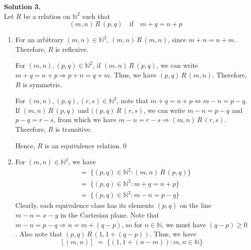 \documentclass[10pt]{article}
\begin{document}
        \textbf{Solution 3.}\\
        Let $R$ be a relation on $\mathbb{N}^2$ such that
        \[(m, n)\,R\,(p, q) \quad\text{if}\quad m + q = n + p\]
        \begin{enumerate}
                \item For an arbitrary $(m, n) \in \mathbb{N}^2$, $(m, n)\,R\,(m, n)$, since $m + n = n + m$. Therefore, $R$
                is reflexive.

                For $(m, n), (p, q) \in \mathbb{N}^2$, if $(m, n)\,R\,(p, q)$, we can write $m + q = n + p \Rightarrow p + n = q + m$.
                Thus, we have $(p, q)\,R\,(m, n)$. Therefore, $R$ is symmetric.

                For $(m, n), (p, q), (r, s) \in \mathbb{N}^2$, note that $m + q = n + p \Leftrightarrow m - n = p - q$.
                If $(m, n)\,R\,(p, q)$ and $((p, q)\,R\,(r, s)$, we can write $m - n = p - q$ and $p - q = r - s$, from which we have
                $m - n = r - s \Rightarrow (m, n)\,R\,(r, s)$. Therefore, $R$ is transitive.

                Hence, $R$ is an equivalence relation.\qed

                \item For $(m, n) \in \mathbb{N}^2$, we have
                \begin{align*}
                [(m, n)] \;&=\; \{(p, q) \in \mathbb{N}^2 : (m, n)\,R\,(p, q)\} \\
                        \;&=\; \{(p, q) \in \mathbb{N}^2 : m + q = n + p\} \\
                        \;&=\; \{(p, q) \in \mathbb{N}^2 : m - n = p - q\}
                \end{align*}
                Clearly, each equivalence class has its elements $(p, q)$ on the line $m - n = x - y$ in the Cartesian plane.
                Note that $m - n = p - q \Rightarrow n = m + (q - p)$, so for $n \in \mathbb{N}$, we must have $(q - p) \geq 0$.
                Also note that $(p , q)\,R\,(1, 1 + (q - p))$. Thus, we have
                \[
                        [(m, n)] \;=\; \{(1, 1 + (n - m)): m, n \in \mathbb{N}\}
                \]\\

                \begin{center}
\end{center}
\end{enumerate}
\end{document}
